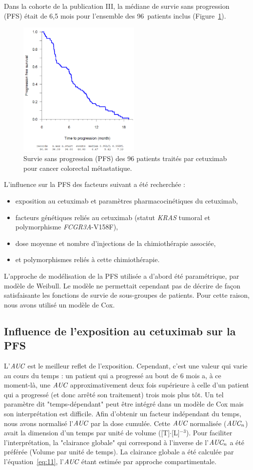 Dans la cohorte de la publication III, la médiane de survie sans progression (PFS) était de 6,5 mois pour l'ensemble des 96~patients inclus (Figure~\ref{fig:23}). 
\begin{figure}[htbp]
	\centering
		\includegraphics[width=6cm]{figures/raster/FIG_23}
	\caption[PFS de 96 patients]{Survie sans progression (PFS) des 96 patients traités par cetuximab pour cancer colorectal métastatique.}
	\label{fig:23}
\end{figure}
L'influence sur la PFS des facteurs suivant a été recherchée :
\begin{itemize}
\item exposition au cetuximab et paramètres pharmacocinétiques du cetuximab,
\item facteurs génétiques reliés au cetuximab (statut \textit{KRAS} tumoral et polymorphisme \textit{FCGR3A}-V158F),
\item dose moyenne et nombre d'injections de la chimiothérapie associée,
\item et polymorphismes reliés à cette chimiothérapie.
\end{itemize}
L'approche de modélisation de la PFS utilisée a d'abord été paramétrique, par modèle de Weibull. Le modèle ne permettait cependant pas de décrire de façon satisfaisante les fonctions de survie de sous-groupes de patients. Pour cette raison, nous avons utilisé un modèle de Cox.
\subsection{Influence de l'exposition au cetuximab sur la PFS}
L'$\operatorname{\textit{AUC}}$ est le meilleur reflet de l'exposition. Cependant, c'est une valeur qui varie au cours du temps : un patient qui a progressé au bout de 6 mois a, à ce moment-là, une $\operatorname{\textit{AUC}}$ approximativement deux fois supérieure à celle d'un patient qui a progressé (et donc arrêté son traitement) trois mois plus tôt. Un tel paramètre dit "temps-dépendant" peut être intégré dans un modèle de Cox mais son interprétation est difficile. Afin d'obtenir un facteur indépendant du temps, nous avons normalisé l'$\operatorname{\textit{AUC}}$ par la dose cumulée. Cette $\operatorname{\textit{AUC}}$ normalisée ($\operatorname{\textit{AUC}}_n$) avait la dimension d'un temps par unité de volume ([T]$\cdot$[L]$^{-3}$). Pour faciliter l'interprétation, la "clairance globale" qui correspond à l'inverse de l'$\operatorname{\textit{AUC}}_n$ a été préférée (Volume par unité de temps). La clairance globale a été calculée par l'équation~\ref{eq:11}, l'$\operatorname{\textit{AUC}}$ étant estimée par approche compartimentale.

